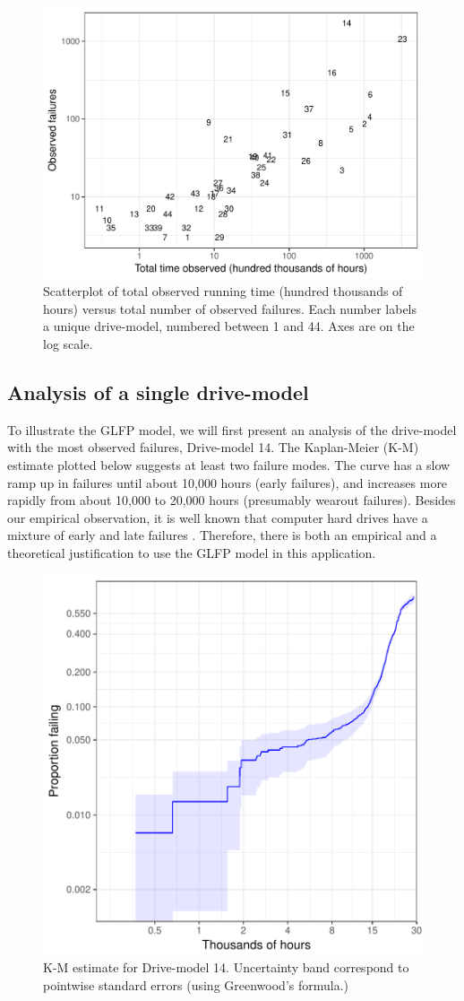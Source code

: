 \documentclass[11pt]{article}
\begin{document}
\begin{figure}[H]
  \includegraphics[width=.9\textwidth]{dm-summ-scatter.pdf}
  \caption{\footnotesize Scatterplot of total observed running time (hundred thousands of hours) versus total number of observed failures.  Each number labels a unique drive-model, numbered between 1 and 44.   Axes are on the log scale.}
  \label{drive-scatter}
\end{figure}

\subsection{Analysis of a single drive-model}
\label{subsec:ex1}
To illustrate the GLFP model, we will first present an analysis of the drive-model with the most observed failures, Drive-model 14.  The Kaplan-Meier (K-M) estimate plotted below suggests at least two failure modes.  The curve has a slow ramp up in failures until about 10,000 hours (early failures), and increases more rapidly from about 10,000 to 20,000 hours (presumably wearout failures).  Besides our empirical observation, it is well known that computer hard drives have a mixture of early and late failures \citep{chan}.  Therefore, there is both an empirical and a theoretical justification to use the GLFP model in this application.

\begin{figure}[H]
\centering
  \includegraphics[width=.6\textwidth]{km14-prob}
  \caption{\footnotesize K-M estimate for Drive-model 14.  Uncertainty band correspond to pointwise standard errors (using Greenwood's formula.)}
  \label{fig1}
\end{figure}
\end{document}
